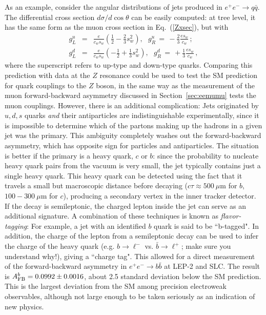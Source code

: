 \documentclass{ws-procs9x6}
\def\beqa{\begin{eqnarray}}
\def\eeqa#1{\label{#1}\end{eqnarray}}
\def\CR{\nonumber \\ }
\def\leqn#1{(\ref{#1})}
\begin{document}
As an example, consider the angular distributions of jets produced in $e^+e^-\to q\bar{q}$. The differential cross section $d\sigma/d\cos\theta$ can be easily computed: at tree level, it has the same form as the muon cross section in Eq.~\leqn{Zxsec}, but with
\beqa
g_L^u &=& \frac{e}{c_ws_w}\left(\frac{1}{2}-\frac{2}{3}s_w^2 \right),~~~g_R^u \,=\, -\frac{2}{3}\frac{es_w}{c_w}\,;\CR
g_L^d &=& \frac{e}{c_ws_w}\left(-\frac{1}{2}+\frac{1}{3}s_w^2\right),~~~g_R^d \,=\, +\frac{1}{3}\frac{es_w}{c_w}\,,
\eeqa{quark_gs}
where the superscript refers to up-type and down-type quarks. Comparing this prediction with data 
at the $Z$ resonance could be used to test the SM prediction for quark couplings to the $Z$ boson, in the same way as the measurement of the muon forward-backward asymmetry discussed in Section~\ref{sec:eemumu} tests the muon couplings. However, there is an additional complication: Jets originated by $u, d, s$ quarks {\it and} their antiparticles are indistinguishable experimentally, since it is impossible to determine which of the partons making up the hadrons in a given jet was the primary. This ambiguity completely washes out the forward-backward asymmetry, which has opposite sign for particles and antiparticles. The situation is better if the primary is a heavy quark, $c$ or $b$: since the probability to nucleate heavy quark pairs from the vacuum is very small, the jet typically contains just a single heavy quark. This heavy quark can be detected 
using the fact that it travels a small but macroscopic distance before decaying ($c\tau\approx 500~\mu$m for $b$, $100-300~\mu$m for $c$), producing a secondary vertex in the inner tracker detector. If the decay is semileptonic, the charged lepton inside the jet can serve as an additional signature. A combination of these techniques is known as {\it flavor-tagging}: For example, a jet with an identified $b$ quark is said to be ``b-tagged". In addition, the charge of the lepton from a semileptonic decay can be used to infer the charge of the heavy quark (e.g. $b\to \ell^-$ vs. $\bar{b}\to \ell^+$; make sure you understand why!), giving a ``charge tag". This allowed for a direct measurement of 
the forward-backward asymmetry in $e^+e^-\to b\bar{b}$ at LEP-2 and SLC. The result is $A_{\rm FB}^b = 0.0992\pm 0.0016$, about 2.5 standard deviation below the SM prediction. This is the largest deviation from the SM among precision electroweak observables, although not large enough to be taken seriously as an indication of new physics. 
\end{document}
